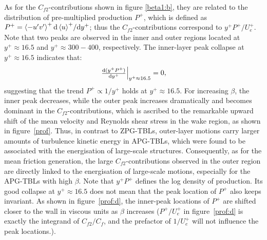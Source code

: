 As for the $C_{f2}$-contributions shown in figure \ref{beta1:b}, {\color{black}they are related to  the distribution of pre-multiplied production $P^+$\cite{Smits2011}, which is defined as $P^+=\left<-u'v'\right>^+ {{\rm d} \left<u\right>^+}/{{\rm d} y^+}$; thus the $C_{f2}$-contributions correspond to $y^+P^+/U_e^+$.} Note that two peaks are observed in the inner and outer regions located at $y^+\approx16.5$ and $y^+\approx300-400$, respectively. {\color{black}
The inner-layer peak collapse at $y^+\approx16.5$ indicates that:
\begin{equation}
\left.\begin{matrix}
\frac{{\rm d} ({y^+P^+})}{{\rm d} y^+}
\end{matrix}\right|_{y^+\approx16.5}=0,
\end{equation}
suggesting that the trend $P^+ \propto 1/y^+$ holds at $y^+\approx16.5$.
}
{\color{black}
For increasing $\beta$, the inner peak decreases, while the outer peak increases dramatically and becomes dominant in the $C_{f2}$-contributions, which is ascribed to the remarkable upward shift of the mean velocity and Reynolds shear stress in the wake region, as shown in figure~\ref{prof}. Thus, in contrast to ZPG-TBLs, outer-layer motions carry larger amounts of turbulence kinetic energy in APG-TBLs, which were found to be associated with the energisation of large-scale structures\cite{Harun2013,Lee2017,Kitsios2017,Lee2008,Vinuesa2018}.}
Consequently, as for the mean friction generation, the large $C_{f2}$-contributions observed in the outer region are directly linked to the energisation of large-scale motions, especially for the APG-TBLs with high $\beta$. 
{\color{black}
Note that $y^+P^+$ defines the log density of production.
Its good collapse at $y^+\approx16.5$ does not mean that the peak location of $P^+$ also keeps invariant. As shown in figure~\ref{prof:d}, the inner-peak locations of $P^+$ are shifted closer to the wall in viscous units as $\beta$ increases ($P^+/U_e^+$ in figure~\ref{prof:d} is exactly the integrand of $C_{f2}/C_f$, and the prefactor of $1/U_e^+$ will not influence the peak locations.).
}

